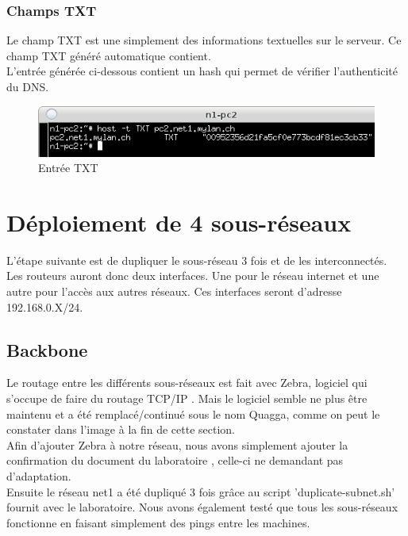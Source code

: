 \documentclass{article}
\begin{document}
\subsubsection{Champs TXT}

Le champ TXT est une simplement des informations textuelles sur le serveur. Ce champ TXT généré automatique contient. \cite{TXT}\\

L'entrée générée ci-dessous contient un hash qui permet de vérifier l'authenticité du DNS.

\begin{figure}[!h]
	\centering
	\includegraphics{./captures/txt-entry.png}
	\caption{Entrée TXT}
	\label{fig:Entrée TXT}
\end{figure}

\clearpage

\section{Déploiement de 4 sous-réseaux}

L'étape suivante est de dupliquer le sous-réseau 3 fois et de les interconnectés. Les routeurs auront donc deux interfaces. Une pour le réseau internet et une autre pour l'accès aux autres réseaux. Ces interfaces seront d'adresse 192.168.0.X/24.\\

\subsection{Backbone}

Le routage entre les différents sous-réseaux est fait avec Zebra, logiciel qui s'occupe de faire du routage TCP/IP \cite{Zebra}. Mais le logiciel semble ne plus être maintenu et a été remplacé/continué sous le nom Quagga, comme on peut le constater dans l'image à la fin de cette section.\\

Afin d'ajouter Zebra à notre réseau, nous avons simplement ajouter la confirmation du document du laboratoire \cite{doc-labo}, celle-ci ne demandant pas d'adaptation.\\

Ensuite le réseau net1 a été dupliqué 3 fois grâce au script 'duplicate-subnet.sh' fournit avec le laboratoire. Nous avons également testé que tous les sous-réseaux fonctionne en faisant simplement des pings entre les machines.
\end{document}
